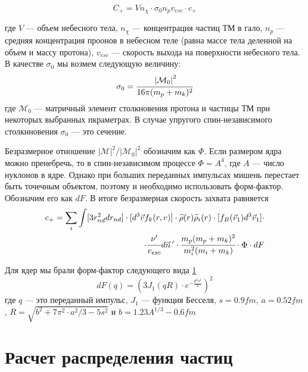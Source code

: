 \begin{equation}
	\label{capture_simple}
	C_+ = Vn_{\chi} \cdot \sigma_{0} n_p v_{esc} \cdot c_+
\end{equation}

где $V$ --- объем небесного тела, $n_{\chi}$ --- концентрация частиц ТМ в гало,
$n_p$ --- средняя концентрация проонов в небесном теле 
(равна массе тела деленной на объем и массу протона), $v_{esc}$ --- скорость выхода на поверхности небесного тела. В качестве  $\sigma_0$ мы возмем следующую величину:
\begin{equation}
	\label{sigma_0}
	\sigma_0 = \cfrac{\left| \mathcal{M}_0 \right|^{2}}{16\pi (m_p+m_k)^2}
\end{equation}
где $\mathcal{M}_0$ --- матричный элемент столкновения протона и частицы ТМ при некоторых
выбранных пкраметрах. В случае упругого спин-независимого столкнновения $\sigma_0$ --- это сечение.

Безразмерное отношение $\left| \mathcal{M} \right|^{2}/
\left| \mathcal{M}_0 \right|^{2}$ обозначим как $\Phi$. Если размером ядра
можно пренебречь, то в спин-независимом процессе $\Phi = A^4$, где $A$ --- число нуклонов в ядре. Однако при больших переданных импульсах мишень перестает быть точечным объектом, поэтому
и необходимо использовать форм-фактор. Обозначим его как $dF$.
В итоге безразмерная скорость захвата равняется
\begin{equation}
\begin{split}
	\label{capture_nd}
	c_+ = \sum_i \int [3r_{nd}^2d r_{nd}]
	\cdot[d^3\vec{v} f_k(r,v)] \cdot 
	\widehat{\rho}(r) \widetilde{\rho}_i(r) 
	\cdot[f_{B}(\vec{v}_1) d^3\vec{v}_1] \cdot\\ 
	\cdot\cfrac{\nu'}{v_{esc}} d\vec{n}\,' \cdot
	\cfrac{m_{p} (m_p+m_k)^2}{m_i^2 ( m_i + m_k)}
	\cdot \Phi \cdot dF
\end{split}
\end{equation}

Для ядер мы брали форм-фактор следующего вида \ref{} 
\begin{equation}
	\label{eq:form_factor}
	dF(q) = \left(3J_1(qR)\cdot e^{-\frac{q^2s^2}{2}}\right)^2
\end{equation}
где $q$ --- это переданный импульс, $J_1$ --- функция Бесселя, $s = 0.9 fm$, $a = 0.52 fm$, $R = \sqrt{b^2+7\pi^2\cdot a^2/3-5s^2}$ и $b = 1.23 A^{1/3} - 0.6 fm$

\section{Расчет распределения частиц}

